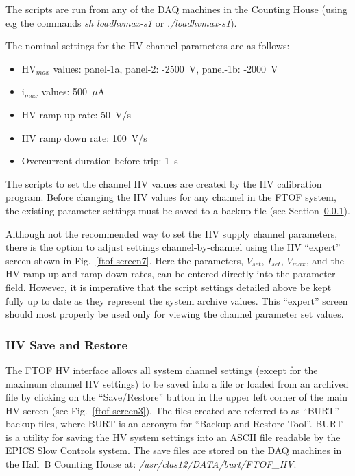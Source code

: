 \documentclass[12pt]{article}
\begin{document}
The scripts are run from any of the DAQ machines in the Counting House (using e.g the
commands {\it sh loadhvmax-s1} or {\it ./loadhvmax-s1}).

The nominal settings for the HV channel parameters are as follows:

\begin{itemize}
\item HV$_{max}$ values: panel-1a, panel-2: -2500~V, panel-1b: -2000~V
\item i$_{max}$ values: 500~$\mu$A
\item HV ramp up rate: 50~V/s
\item HV ramp down rate: 100~V/s
\item Overcurrent duration before trip: 1~s
\end{itemize}

The scripts to set the channel HV values are created by the HV calibration program. 
Before changing the HV values for any channel in the FTOF system, the existing parameter 
settings must be saved to a backup file (see Section~\ref{save-restore}).

Although not the recommended way to set the HV supply channel parameters, there is the 
option to adjust settings channel-by-channel using the HV ``expert'' screen shown in 
Fig.~\ref{ftof-screen7}. Here the parameters, $V_{set}$, $I_{set}$, $V_{max}$, and the HV 
ramp up and ramp down rates, can be entered directly into the parameter field. However, 
it is imperative that the script settings detailed above be kept fully up to date as 
they represent the system archive values. This ``expert'' screen should most properly 
be used only for viewing the channel parameter set values.

\subsubsection{HV Save and Restore}
\label{save-restore}

The FTOF HV interface allows all system channel settings (except for the maximum channel
HV settings) to be saved into a file or loaded from an archived file by clicking on the
``Save/Restore'' button in the upper left corner of the main HV screen (see
Fig.~\ref{ftof-screen3}). The files created are referred to as ``BURT'' backup files, where
BURT is an acronym for ``Backup and Restore Tool''. BURT is a utility for saving the HV system
settings into an ASCII file readable by the EPICS Slow Controls system. The save files are
stored on the DAQ machines in the Hall~B Counting House at:
{\it /usr/clas12/DATA/burt/FTOF\_HV}.
\end{document}
